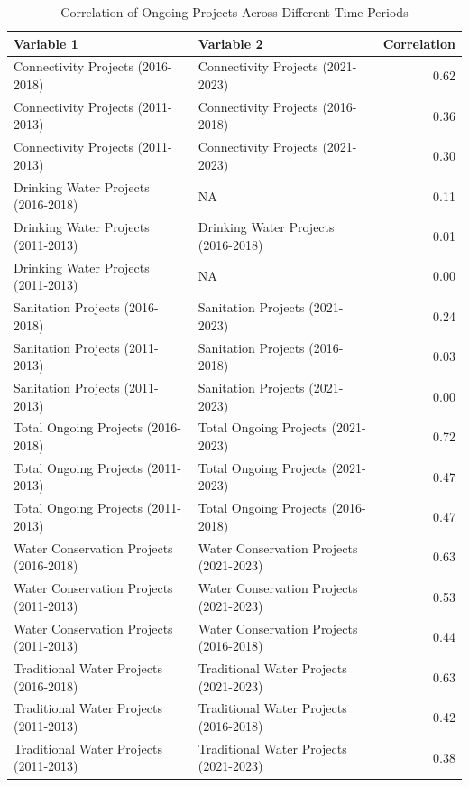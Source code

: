 \begin{table}[!h]
\centering
\caption{Correlation of Ongoing Projects Across Different Time Periods}
\centering
\fontsize{6}{8}\selectfont
\begin{tabular}[t]{llr}
\toprule
Variable 1 & Variable 2 & Correlation\\
\midrule
Connectivity Projects (2016-2018) & Connectivity Projects (2021-2023) & 0.62\\
Connectivity Projects (2011-2013) & Connectivity Projects (2016-2018) & 0.36\\
Connectivity Projects (2011-2013) & Connectivity Projects (2021-2023) & 0.30\\
Drinking Water Projects (2016-2018) & NA & 0.11\\
Drinking Water Projects (2011-2013) & Drinking Water Projects (2016-2018) & 0.01\\
\addlinespace
Drinking Water Projects (2011-2013) & NA & 0.00\\
Sanitation Projects (2016-2018) & Sanitation Projects (2021-2023) & 0.24\\
Sanitation Projects (2011-2013) & Sanitation Projects (2016-2018) & 0.03\\
Sanitation Projects (2011-2013) & Sanitation Projects (2021-2023) & 0.00\\
Total Ongoing Projects (2016-2018) & Total Ongoing Projects (2021-2023) & 0.72\\
\addlinespace
Total Ongoing Projects (2011-2013) & Total Ongoing Projects (2021-2023) & 0.47\\
Total Ongoing Projects (2011-2013) & Total Ongoing Projects (2016-2018) & 0.47\\
Water Conservation Projects (2016-2018) & Water Conservation Projects (2021-2023) & 0.63\\
Water Conservation Projects (2011-2013) & Water Conservation Projects (2021-2023) & 0.53\\
Water Conservation Projects (2011-2013) & Water Conservation Projects (2016-2018) & 0.44\\
\addlinespace
Traditional Water Projects (2016-2018) & Traditional Water Projects (2021-2023) & 0.63\\
Traditional Water Projects (2011-2013) & Traditional Water Projects (2016-2018) & 0.42\\
Traditional Water Projects (2011-2013) & Traditional Water Projects (2021-2023) & 0.38\\
\bottomrule
\end{tabular}
\end{table}

